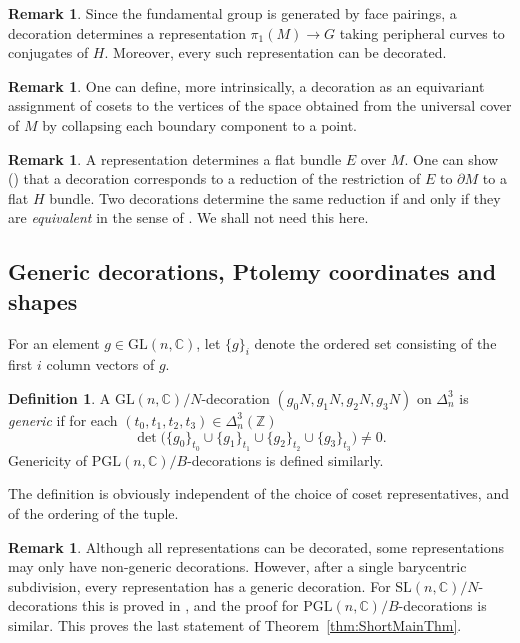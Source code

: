 \documentclass[12pt]{amsart}
\theoremstyle{definition}
\newtheorem{definition}[theorem]{Definition}
\newtheorem{remark}[theorem]{Remark}
\numberwithin{equation}{section}
\def\SL{\mathrm{SL}}
\def\PGL{\mathrm{PGL}}
\def\GL{\mathrm{GL}}
\def\Z{\mathbb{Z}}
\def\C{\mathbb{C}}
\begin{document}
\begin{remark} Since the fundamental group is generated by face pairings, a decoration determines a representation $\pi_1(M)\to G$ taking peripheral curves to conjugates of $H$. Moreover, every such representation can be decorated.
\end{remark}
\begin{remark}
One can define, more intrinsically, a decoration as an equivariant assignment of cosets to the vertices of the space obtained from the universal cover of $M$ by collapsing each boundary component to a point. 
\end{remark}

\begin{remark}\label{rm:DecorationsAndBundles} A representation determines a flat bundle $E$ over $M$. One can show (\cite[Prop.~4.6]{GaroufalidisThurstonZickert}) that a decoration corresponds to a reduction of the restriction of $E$ to $\partial M$ to a flat $H$ bundle. Two decorations determine the same reduction if and only if they are \emph{equivalent} in the sense of \cite[Def.~4.4]{GaroufalidisThurstonZickert}. We shall not need this here.
\end{remark}


\subsection{Generic decorations, Ptolemy coordinates and shapes}
For an element $g\in\GL(n,\C)$, let $\{g\}_i$ denote the ordered set consisting of the first $i$ column vectors of $g$.
\begin{definition}\label{def:generic}
A $\GL(n,\C)/N$-decoration $(g_0N,g_1N,g_2N,g_3N)$ on $\Delta^3_n$ is \emph{generic} if for each $(t_0,t_1,t_2,t_3)\in\Delta_n^3(\Z)$
\begin{equation}\label{eqn:PtolemyDets}
\det\big(\{g_0\}_{t_0}\cup\{g_1\}_{t_1}\cup\{g_2\}_{t_2}\cup\{g_3\}_{t_3}\big)\neq 0.
\end{equation}
Genericity of $\PGL(n,\C)/B$-decorations is defined similarly.
\end{definition}
The definition is obviously independent of the choice of coset representatives, and of the ordering of the tuple.

\begin{remark}\label{rm:FineTriangulation}
Although all representations can be decorated, some representations may only have non-generic decorations. However, after a single barycentric subdivision, every representation has a generic decoration. For $\SL(n,\C)/N$-decorations this is proved in \cite[Prop.~5.4]{GaroufalidisThurstonZickert}, and the proof for $\PGL(n,\C)/B$-decorations is similar. This proves the last statement of Theorem~\ref{thm:ShortMainThm}.
\end{remark}
\end{document}
